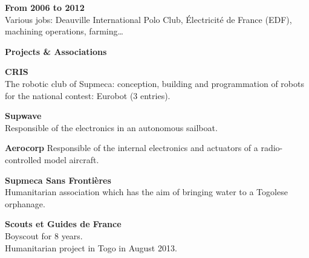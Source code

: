 \documentclass[a4paper,11pt,final]{memoir}
\newcommand{\Sep}{\vspace{1.5em}}
\newcommand{\SmallSep}{\vspace{0.5em}}
\newcommand{\CVSection}[1]
	{\Large\textbf{#1}\par
	\SmallSep\normalsize\normalfont}
\newcommand{\CVItem}[1]
	{\textbf{\color{RoyalBlue} #1}\normalsize\normalfont}
\begin{document}
\CVItem{From 2006 to 2012}\\
Various jobs: Deauville International Polo Club, Électricité de France (EDF), machining operations, farming\ldots
\Sep

\CVSection{Projects \& Associations}
\CVItem{CRIS}\\
The robotic club of Supmeca: conception, building and programmation of
robots for the national contest: Eurobot (3 entries). %
\SmallSep

\CVItem{Supwave}\\
Responsible of the electronics in an autonomous sailboat.
\SmallSep

\CVItem{Aerocorp}
Responsible of the internal electronics and actuators of a radio-controlled model aircraft.
\SmallSep

\CVItem{Supmeca Sans Frontières}\\
Humanitarian association which has the aim of bringing water to a Togolese orphanage.
\SmallSep

\CVItem{Scouts et Guides de France}\\
Boyscout for 8 years.\\
Humanitarian project in Togo in August 2013.

\end{document}
